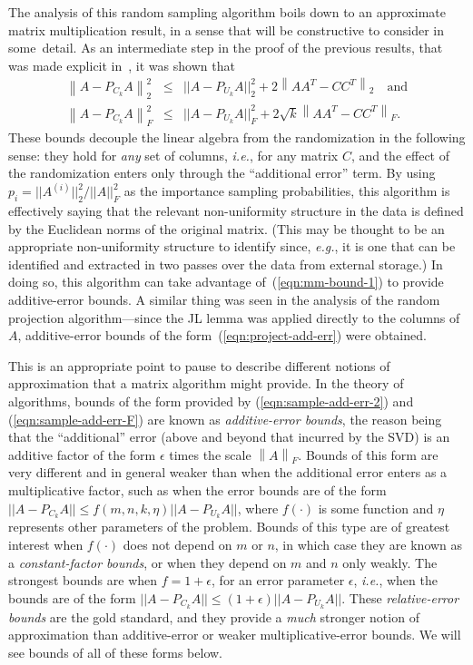 \documentclass[twoside]{article}
\newcommand{\TNorm }[1]{\mbox{}\left\|#1\right\|_2  }
\newcommand{\TNormS}[1]{\mbox{}\left\|#1\right\|_2^2}
\newcommand{\FNorm }[1]{\mbox{}\left\|#1\right\|_F  }
\newcommand{\FNormS}[1]{\mbox{}\left\|#1\right\|_F^2}
\begin{document}
The analysis of this random sampling algorithm boils down to an approximate matrix 
multiplication result, in a sense that will be constructive to consider 
in some~detail.
As an intermediate step in the proof of the previous results, that was 
made explicit in~\cite{dkm_matrix2}, it was shown that
\begin{eqnarray*}
\TNormS{A-P_{C_k}A} &\le& ||A-P_{U_k}A ||_2^2 + 2        \TNorm{AA^T-CC^T} \quad\mbox{and} \\
\FNormS{A-P_{C_k}A} &\le& ||A-P_{U_k}A ||_F^2 + 2\sqrt{k}\FNorm{AA^T-CC^T} .
\end{eqnarray*}
These bounds decouple the linear 
algebra from the randomization in the following sense: they hold for 
\emph{any} set of columns, \emph{i.e.}, for any matrix $C$, and the effect of the randomization enters only 
through the ``additional error'' term.
By using $p_i=||A^{(i)}||_2^2/||A||_F^2$ as the importance sampling 
probabilities, this algorithm is effectively saying that the relevant 
non-uniformity structure in the data is defined by the Euclidean norms of 
the original matrix.
(This may be thought to be an appropriate non-uniformity structure to 
identify since, \emph{e.g.}, it is one that can be identified and extracted
in two passes over the data from external storage.)
In doing so, this algorithm can take advantage of~(\ref{eqn:mm-bound-1}) to 
provide additive-error bounds.
A similar thing was seen in the analysis of the random projection 
algorithm---since the JL lemma was applied directly to the columns of $A$, 
additive-error bounds of the form~(\ref{eqn:project-add-err}) were 
obtained.

This is an appropriate point to pause to describe different notions of 
approximation that a matrix algorithm might provide.
In the theory of algorithms, bounds of the form provided by 
(\ref{eqn:sample-add-err-2}) and (\ref{eqn:sample-add-err-F}) are known as 
\emph{additive-error bounds}, the reason being that the ``additional'' 
error (above and beyond that incurred by the SVD) is an additive factor of 
the form $\epsilon$ times the scale $\FNorm{A}$.
Bounds of this form are very different and in general weaker than when the 
additional error enters as a multiplicative factor, such as when the error 
bounds are of the form 
$ ||A-P_{C_k}A|| \le f(m,n,k,\eta) ||A-P_{U_k}A ||$, where $f(\cdot)$ is 
some function and $\eta$ represents other parameters of the problem. 
Bounds of this type are of greatest interest when $f(\cdot)$ does not 
depend on $m$ or $n$, in which case they are known as a \emph{constant-factor 
bounds}, or when they depend on $m$ and $n$ only weakly.
The strongest bounds are when $f = 1+\epsilon$, for an error parameter 
$\epsilon$, \emph{i.e.}, when the bounds are of the form
$ ||A-P_{C_k}A|| \le (1+\epsilon) ||A-P_{U_k}A ||$.
These \emph{relative-error bounds} are the gold standard, and they provide a 
\emph{much} stronger notion of approximation than additive-error or 
weaker multiplicative-error bounds.
We will see bounds of all of these forms below.  
\end{document}
